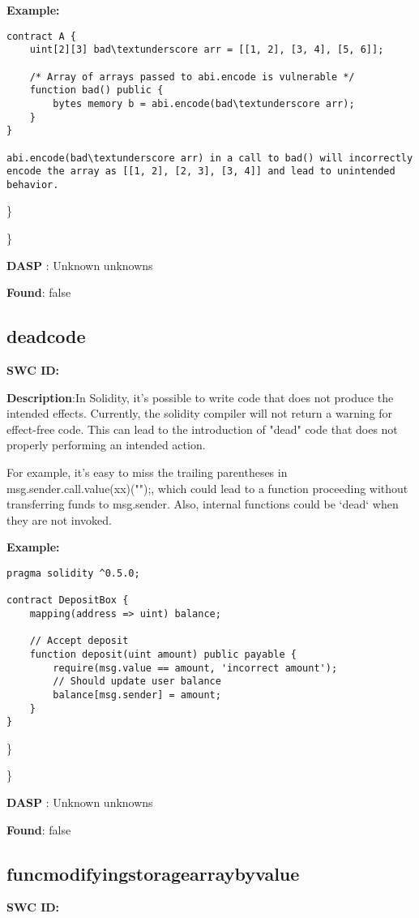 \documentclass{article}
\begin{document}
\textbf{Example:} 
\begin{verbatim}
contract A {
    uint[2][3] bad\textunderscore arr = [[1, 2], [3, 4], [5, 6]];

    /* Array of arrays passed to abi.encode is vulnerable */
    function bad() public {
        bytes memory b = abi.encode(bad\textunderscore arr);
    }
}

abi.encode(bad\textunderscore arr) in a call to bad() will incorrectly encode the array as [[1, 2], [2, 3], [3, 4]] and lead to unintended behavior.

\end{verbatim}\} 

\} 

\textbf{DASP} : Unknown unknowns

\textbf{Found}: false

\subsection{dead\textunderscore code} 
\textbf{SWC \textunderscore ID:} 

\textbf{Description}:In Solidity, it's possible to write code that does not produce the intended effects. Currently, the solidity compiler will not return a warning for effect-free code. This can lead to the introduction of "dead" code that does not properly performing an intended action.

For example, it's easy to miss the trailing parentheses in msg.sender.call.value(xx)("");, which could lead to a function proceeding without transferring funds to msg.sender. Also, internal functions could be `dead` when they are not invoked.


\textbf{Example:} 
\begin{verbatim}
pragma solidity ^0.5.0;

contract DepositBox {
    mapping(address => uint) balance;

    // Accept deposit
    function deposit(uint amount) public payable {
        require(msg.value == amount, 'incorrect amount');
        // Should update user balance
        balance[msg.sender] = amount;
    }
}

\end{verbatim}\} 

\} 

\textbf{DASP} : Unknown unknowns

\textbf{Found}: false

\subsection{func\textunderscore modifying\textunderscore storage\textunderscore array\textunderscore by\textunderscore value} 
\textbf{SWC \textunderscore ID:} 
\end{document}
